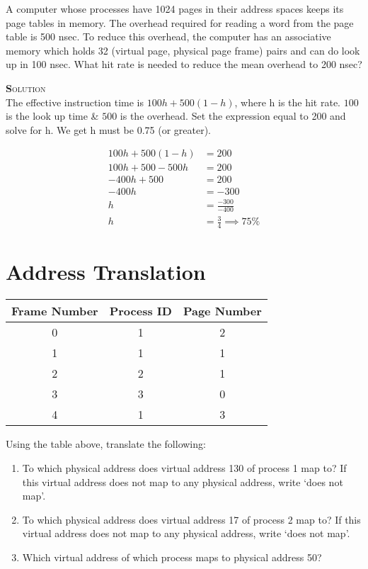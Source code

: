 \documentclass{article}
\newcommand{\smallcaps}[1]{\textsc{\textbf #1}\\}
\begin{document}
  \begin{multicols}{2}
    A computer whose processes have 1024 pages in their address spaces keeps
    its page tables in memory. The overhead required for reading a word from
    the page table is 500 nsec.  To reduce this  overhead, the computer has an
    associative  memory  which holds 32 (virtual  page,  physical  page frame)
    pairs and can do look up in 100 nsec.  What hit rate is needed  to reduce
    the mean overhead to 200 nsec?

    \smallcaps{Solution}

    The effective instruction time is $100h + 500(1-h)$, where h is the
    hit rate. $100$ is the look up time \& $500$ is the overhead. Set the
    expression equal to 200 and solve for h. We get h must be 0.75 (or greater).

    \begin{align*}
      100h + 500(1-h) &= 200 \\
      100h + 500 - 500h &= 200 \\
      -400h + 500 &= 200 \\
      -400h &= -300 \\
      h &= \frac{-300}{-400} \\
      h &= \frac{3}{4} \implies 75\%
    \end{align*}

    \section*{Address Translation}
    \begin{tabular}{|c|c|c|}
      \hline
      Frame Number & Process ID & Page Number \\
      \hline
      0 & 1 & 2 \\
      \hline
      1 & 1 & 1 \\
      \hline
      2 & 2 & 1 \\
      \hline
      3 & 3 & 0 \\
      \hline
      4 & 1 & 3 \\
      \hline
    \end{tabular}

    Using the table above, translate the following:

    \begin{enumerate}
      \item To which physical address does virtual address 130 of process 1 map to?
        If this virtual address does not map to any physical address, write `does not map'.
      \item To which physical address does virtual address 17 of process 2 map to?
        If this virtual address does not map to any physical address, write `does not map'.
      \item Which virtual address of which process maps to physical address 50?
    \end{enumerate}


\end{multicols}
\end{document}
